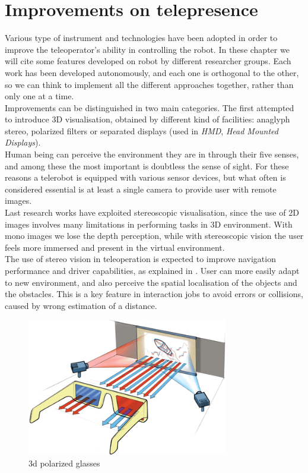 \section{Improvements on telepresence}
\label{intro:improvements_telepresence}

Various type of instrument and technologies have been adopted in order
to improve the teleoperator's ability in controlling the robot. In
these chapter we will cite some features developed on \morduc{}
robot by different researcher groups. Each work has been developed
autonomously, and each one is orthogonal to the other, so we can think
to implement all the different approaches together, rather than only one
at a time.
\\
Improvements can be distinguished in two main categories. The
first attempted to introduce 3D visualisation, obtained by different
kind of facilities: anaglyph stereo, polarized filters or separated
displays (used in \textit{HMD}, \textit{Head Mounted Displays}).
\\
Human being can perceive the environment they are in through their
five senses, and among these the most important is doubtless the sense
of sight.
For these reasons a telerobot is equipped with various sensor devices,
but what often is considered essential is at least a single camera to
provide user with remote images.
\\
Last research works have exploited stereoscopic visualisation, since
the use of 2D images involves many limitations in performing tasks
in 3D environment. With mono images we lose the depth perception,
while with stereoscopic vision the user feels more immersed and
present in the virtual environment.
\\
The use of stereo vision in teleoperation is expected
to improve navigation performance and driver capabilities, as explained in
\cite{morduc:neri}. User can more easily adapt to new environment, and
also perceive the spatial localisation of the objects and the obstacles.
This is a key feature in interaction jobs to avoid errors or collisions,
caused by wrong estimation of a distance.
\begin{figure} [!h]
  \begin{center}
    \includegraphics[width=250pt]{img/3d-glasses.png}
    \caption{3d polarized glasses}
    \label{fig:3d-glasses}
  \end{center}
\end{figure}
